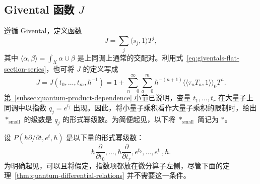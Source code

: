 \subsection{Givental 函数 \texorpdfstring{$J$}{J}}\label{subsec:giventals-j-function}
遵循 Givental，定义函数
\begin{equation}\label{eq:giventals-j-pairing-definition}
J=\sum_j\langle s_j,1\rangle T^j,
\end{equation}
其中 $\langle\alpha,\beta\rangle=\int_X\alpha\cup\beta$ 是上同调上通常的交配对。利用式~\eqref{eq:giventals-flat-section-series}，也可将 $J$ 的定义写成
\begin{equation}\label{eq:giventals-j-descendant-series}
J=J(t_0,\ldots,t_m,\hbar^{-1})
=1+\sum_{n=0}^{\infty}\sum_{a=0}^m\hbar^{-(n+1)}
\langle\!\langle\tau_nT_a,1\rangle\!\rangle_0T^a.
\end{equation}
\hyperref[subsec:quantum-product-dependence]{第~\ref*{subsec:quantum-product-dependence} 小节}已说明，变量 $t_1,\ldots,t_r$ 在大量子上同调中以指数 $q_j=e^{t_j}$ 出现。因此，将小量子乘积看作大量子乘积的限制时，给出 $*_{\mathrm{small}}$ 的级数是
$q_j$ 的形式幂级数。为简便起见，以下将 $*_{\mathrm{small}}$ 简记为 $*$。

设 $P(\hbar\partial/\partial t,e^t,\hbar)$ 是以下量的形式幂级数：
\[
\hbar\frac{\partial}{\partial t_0},\ldots,
\hbar\frac{\partial}{\partial t_r},e^{t_0},\ldots,e^{t_r},\hbar.
\]
为明确起见，可以且将假定，指数项都放在微分算子左侧，尽管下面的定理~\ref{thm:quantum-differential-relations} 并不需要这一条件。

